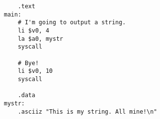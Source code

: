 

\newcommand{\hmwkTitle}{Exercise\ \#1} 
\newcommand{\hmwkDueDate}{Monday,\  February 10,\ 2014} 
\newcommand{\hmwkClass}{TDT4258: Energy Efficient Computer Design}



\maketitle



\newpage
\tableofcontents
\newpage




\begin{homeworkProblem}

\begin{lstlisting}
    .text
main:
    # I'm going to output a string.
    li $v0, 4
    la $a0, mystr
    syscall

    # Bye!
    li $v0, 10
    syscall

    .data
mystr:
    .asciiz "This is my string. All mine!\n"
\end{lstlisting}
\end{homeworkProblem}

\begin{homeworkProblem}


\end{homeworkProblem}

\begin{homeworkProblem}


\end{homeworkProblem}


